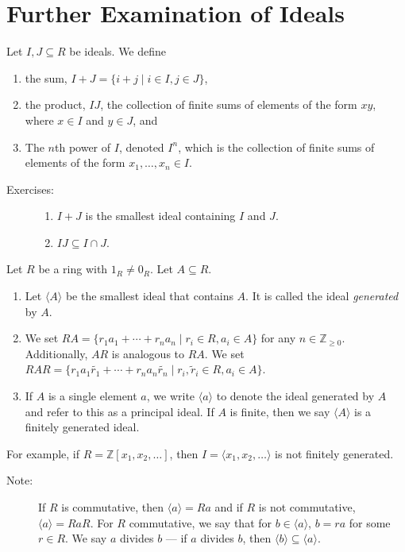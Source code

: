 \documentclass[8pt]{extarticle}
\newcommand{\Z}{\mathbb{Z}}
\begin{document}
  \section{Further Examination of Ideals}%
  Let $I,J\subseteq R$ be ideals. We define
  \begin{enumerate}[(1)]
    \item the sum, $I+J = \{i+j\mid i\in I,j\in J\}$,
    \item the product, $IJ$, the collection of finite sums of elements of the form $xy$, where $x\in I$ and $y\in J$, and
    \item The $n$th power of $I$, denoted $I^n$, which is the collection of finite sums of elements of the form $x_1,\dots,x_n\in I$.
  \end{enumerate}
  \begin{description}
    \item[Exercises:]\hfill
      \begin{enumerate}[(1)]
        \item $I+J$ is the smallest ideal containing $I$ and $J$.
        \item $IJ\subseteq I\cap J$.
      \end{enumerate}
  \end{description}
  Let $R$ be a ring with $1_R\neq 0_R$. Let $A\subseteq R$.
  \begin{enumerate}[(1)]
    \item Let $\langle A\rangle$ be the smallest ideal that contains $A$. It is called the ideal \textit{generated} by $A$.
    \item We set $RA = \{r_1a_1 + \cdots + r_na_n\mid r_i\in R, a_i\in A\}$ for any $n\in \Z_{\geq 0}$. Additionally, $AR$ is analogous to $RA$. We set $RAR = \{r_1a_1\tilde{r_1} + \cdots + r_na_n\tilde{r_n}\mid r_i,\tilde{r}_i\in R, a_i\in A\}$.
    \item If $A$ is a single element $a$, we write $\langle a \rangle$ to denote the ideal generated by $A$ and refer to this as a principal ideal. If $A$ is finite, then we say $\langle A \rangle$ is a finitely generated ideal.
  \end{enumerate}
  For example, if $R = \Z[x_1,x_2,\dots]$, then $I = \langle x_1,x_2,\dots\rangle$ is not finitely generated.
  \begin{description}
    \item[Note:] If $R$ is commutative, then $\langle a \rangle = Ra$ and if $R$ is not commutative, $\langle a \rangle = RaR$. For $R$ commutative, we say that for $b\in \langle a \rangle$, $b = ra$ for some $r\in R$. We say $a$ divides $b$ --- if $a$ divides $b$, then $\langle b \rangle\subseteq \langle a \rangle$.
  \end{description}
\end{document}

